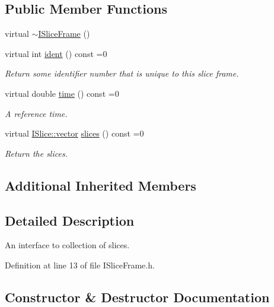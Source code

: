 \subsection*{Public Member Functions}
\begin{DoxyCompactItemize}
\item 
virtual \hyperlink{class_wire_cell_1_1_i_slice_frame_aaf3d601a0bdb71db6c6283c3db3c6660}{$\sim$\+I\+Slice\+Frame} ()
\item 
virtual int \hyperlink{class_wire_cell_1_1_i_slice_frame_a225275e1508b1002f71727f07d802dba}{ident} () const =0
\begin{DoxyCompactList}\small\item\em Return some identifier number that is unique to this slice frame. \end{DoxyCompactList}\item 
virtual double \hyperlink{class_wire_cell_1_1_i_slice_frame_ae0ac97f27ac3783656dd51a31ccbf69b}{time} () const =0
\begin{DoxyCompactList}\small\item\em A reference time. \end{DoxyCompactList}\item 
virtual \hyperlink{class_wire_cell_1_1_i_data_ae1a9f863380499bb43f39fabb6276660}{I\+Slice\+::vector} \hyperlink{class_wire_cell_1_1_i_slice_frame_ad3aa9394b6202e3ea4fbd30dbcc1ba2a}{slices} () const =0
\begin{DoxyCompactList}\small\item\em Return the slices. \end{DoxyCompactList}\end{DoxyCompactItemize}
\subsection*{Additional Inherited Members}


\subsection{Detailed Description}
An interface to collection of slices. 

Definition at line 13 of file I\+Slice\+Frame.\+h.



\subsection{Constructor \& Destructor Documentation}
\mbox{\label{class_wire_cell_1_1_i_slice_frame_aaf3d601a0bdb71db6c6283c3db3c6660}} 
